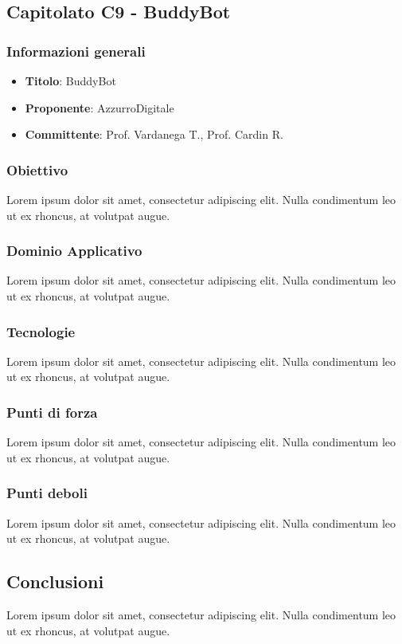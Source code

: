 \subsection{Capitolato C9 - BuddyBot}
     \subsubsection{Informazioni generali}
        \begin{itemize}
            \item \textbf{Titolo}: BuddyBot
            \item \textbf{Proponente}: AzzurroDigitale
            \item \textbf{Committente}: Prof. Vardanega T., Prof. Cardin R.
        \end{itemize}
    \subsubsection{Obiettivo}
    Lorem ipsum dolor sit amet, consectetur adipiscing elit. Nulla condimentum leo ut ex rhoncus, at volutpat augue.
     \subsubsection{Dominio Applicativo}
    Lorem ipsum dolor sit amet, consectetur adipiscing elit. Nulla condimentum leo ut ex rhoncus, at volutpat augue.
    \subsubsection{Tecnologie}
    Lorem ipsum dolor sit amet, consectetur adipiscing elit. Nulla condimentum leo ut ex rhoncus, at volutpat augue.
    \subsubsection{Punti di forza}
    Lorem ipsum dolor sit amet, consectetur adipiscing elit. Nulla condimentum leo ut ex rhoncus, at volutpat augue.
    \subsubsection{Punti deboli}
    Lorem ipsum dolor sit amet, consectetur adipiscing elit. Nulla condimentum leo ut ex rhoncus, at volutpat augue.
    \subsection{Conclusioni}
    Lorem ipsum dolor sit amet, consectetur adipiscing elit. Nulla condimentum leo ut ex rhoncus, at volutpat augue.